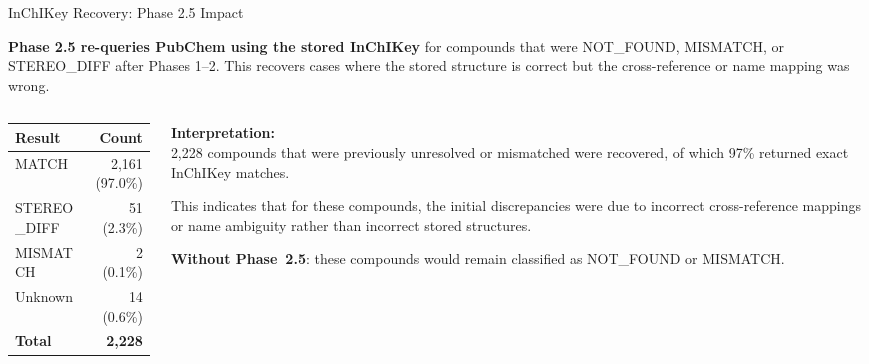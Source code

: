 \documentclass[aspectratio=169,11pt]{beamer}
\begin{document}
\begin{frame}{InChIKey Recovery: Phase 2.5 Impact}

\textbf{Phase 2.5 re-queries PubChem using the stored InChIKey} for
compounds that were NOT\_FOUND, MISMATCH, or STEREO\_DIFF after
Phases 1--2. This recovers cases where the stored structure is correct
but the cross-reference or name mapping was wrong.

\bigskip

\begin{columns}[T]
\begin{column}{0.45\textwidth}
\begin{table}[h]
\centering
\begin{tabular}{lr}
\toprule
\textbf{Result} & \textbf{Count} \\
\midrule
MATCH              & 2,161 (97.0\%) \\
STEREO\_DIFF       &    51 (2.3\%) \\
MISMATCH           &     2 (0.1\%) \\
Unknown            &    14 (0.6\%) \\
\midrule
\textbf{Total}     & \textbf{2,228} \\
\bottomrule
\end{tabular}
\end{table}
\end{column}

\begin{column}{0.50\textwidth}
\textbf{Interpretation:}\\[4pt]
\small
2,228 compounds that were previously unresolved or mismatched
were recovered, of which 97\% returned exact InChIKey matches.

\medskip
This indicates that for these compounds, the initial
discrepancies were due to incorrect cross-reference mappings
or name ambiguity rather than incorrect stored structures.

\medskip
\textbf{Without Phase~2.5}: these compounds would remain
classified as NOT\_FOUND or MISMATCH.
\end{column}
\end{columns}

\end{frame}
\end{document}
